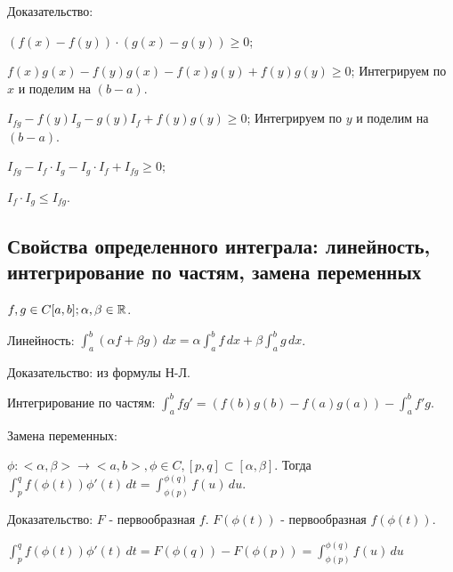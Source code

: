 \documentclass[../main.tex]{subfiles}
\begin{document}
Доказательство:

$(f(x) - f(y)) \cdot (g(x) - g(y)) \geq 0$;

$f(x)g(x) - f(y)g(x) - f(x)g(y) + f(y)g(y) \geq 0$; Интегрируем по $x$ и поделим на $(b - a)$.

$I_{fg} - f(y)I_g - g(y)I_f + f(y)g(y) \geq 0$; Интегрируем по $y$ и поделим на $(b - a)$.

$I_{fg} - I_f \cdot I_g - I_g \cdot I_f + I_{fg} \geq 0$;

$I_f \cdot I_g \leq I_{fg}$.

\newpage


\subsection{Свойства определенного интеграла: линейность, интегрирование по частям, замена переменных}

$f, g \in C[a, b]; \alpha, \beta \in \mathbb{R}$.

Линейность: $\int_{a}^{b} (\alpha f + \beta g) \,dx = \alpha \int_{a}^{b} f \,dx + \beta \int_{a}^{b} g \,dx$.

Доказательство: из формулы Н-Л.

Интегрирование по частям: $\int_{a}^{b} fg' = (f(b)g(b) - f(a)g(a)) - \int_{a}^{b} f'g$.

Замена переменных: 

$\phi : <\alpha, \beta> \to <a, b>, \phi \in C, [p, q] \subset [\alpha, \beta]$. Тогда $\int_{p}^{q} f(\phi(t))\phi'(t)\,dt = \int_{\phi(p)}^{\phi(q)} f(u)\,du$.

Доказательство: $F$ - первообразная $f$. $F(\phi(t))$ - первообразная $f(\phi(t))$.

$\int_{p}^{q} f(\phi(t))\phi'(t)\,dt = F(\phi(q)) - F(\phi(p)) = \int_{\phi(p)}^{\phi(q)} f(u)\,du$

\newpage
\end{document}
